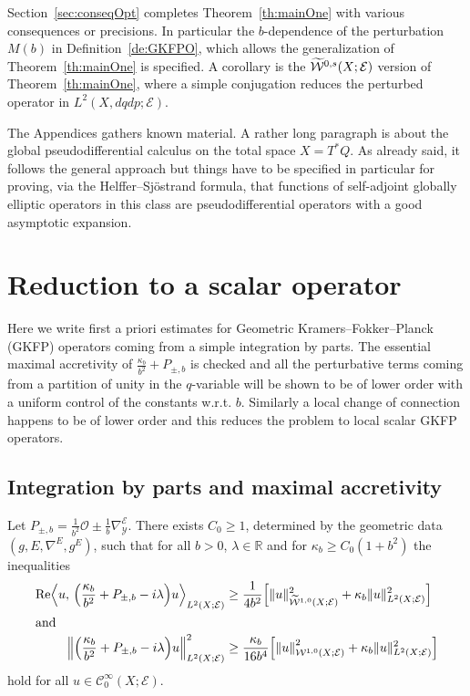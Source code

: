 \documentclass[AHL,Unicode,longabstracts]{cedram}
\newcommand{\R}{\mathbb{R}}
\newcommand{\clW}{\mathcal{W}}
\newcommand{\clC}{\mathcal{C}}
\newcommand{\clY}{\mathcal{Y}}
\newcommand{\clO}{\mathcal{O}}
\newcommand{\clE}{\mathcal{E}}
\DeclareMathOperator{\Ree}{Re}
\newcommand\norm[1]{\left\lVert#1\right\rVert}
\let\oldtilde\tilde
\renewcommand*{\tilde}[1]{\mathchoice{\widetilde{#1}}{\widetilde{#1}}{\oldtilde{#1}}{\oldtilde{#1}}}
\let\originalleft\left
\let\originalright\right
\renewcommand{\left}{\mathopen{}\mathclose\bgroup\originalleft}
\renewcommand{\right}{\aftergroup\egroup\originalright}
\begin{document}
Section~\ref{sec:conseqOpt} completes Theorem~\ref{th:mainOne} with various consequences or precisions. In particular the $b$-dependence of the perturbation $M(b)$ in Definition~\ref{de:GKFPO}, which allows the generalization of Theorem~\ref{th:mainOne} is specified. A corollary is the $\tilde{\clW}^{0,s}(X;\clE)$ version of Theorem~\ref{th:mainOne}, where a simple conjugation reduces the perturbed operator in $L^2(X,dqdp;\clE)$.

The Appendices gathers known material. A rather long paragraph is about the global pseudodifferential calculus on the total space $X=T^*Q$. As already said, it follows the general approach but things have to be specified in particular for proving, via the Helffer--Sj\"ostrand formula, that functions of self-adjoint globally elliptic operators in this class are pseudodifferential operators with a good asymptotic expansion.


\section{Reduction to a scalar operator}\label{sec:redscal}

Here we write first a priori estimates for Geometric Kramers--Fokker--Planck (GKFP) operators coming from a simple integration by parts. The essential maximal accretivity of $\frac{\kappa_{b}}{b^{2}}+P_{\pm,b}$ is checked and all the perturbative terms coming from a partition of unity in the $q$-variable will be shown to be of lower order with a uniform control of the constants w.r.t. $b$. Similarly a local change of connection happens to be of lower order and this reduces the problem to local scalar GKFP operators.

\pagebreak
\subsection{Integration by parts and maximal accretivity}

\begin{prop}\label{pr:IppIneqWithRealPart}
\label{pr:IPPineq}
Let $P_{\pm, b}=\frac{1}{b^{2}}\clO\pm \frac{1}{b}\nabla^{\clE}_{\clY}$. There exists $C_{0}\geq 1$, determined by the geometric data $(g,E,\nabla^{E},g^{E})$, such that for all $b>0$, $\lambda\in \R$ and for $\kappa_{b}\geq C_{0}(1+b^{2})$ the inequalities
\begin{align}
\Ree\left\langle u,\, \left(\frac{\kappa_{b}}{b^{2}}+P_{\pm, b}-i\lambda\right) u\right\rangle_{L^{2}(X;\clE)} &\geq \frac{1}{4b^{2}}
\left[
\|u\|_{\widetilde{\clW}^{1,0}(X;\clE)}^{2}+\kappa_{b}\|u\|_{L^{2}(X;\clE)}^{2}\right]\label{eq:IPPineq}\\
\intertext{and}
\left\| \left(\frac{\kappa_{b}}{b^{2}}+P_{\pm, b}-i\lambda\right) u \right\|_{L^{2}(X;\clE)}^{2} &\geq \frac{\kappa_{b}}{16b^{4}}
\left[
\norm{u}_{\clW^{1,0}(X;\clE)}^{2} +\kappa_{b}\|u\|_{L^{2}(X;\clE)}^{2}\right]
\label{eq:secondIPPineq}
\end{align}
hold for all $ u\in \clC^{\infty}_{0}(X;\clE)$.
\end{prop}
\end{document}
